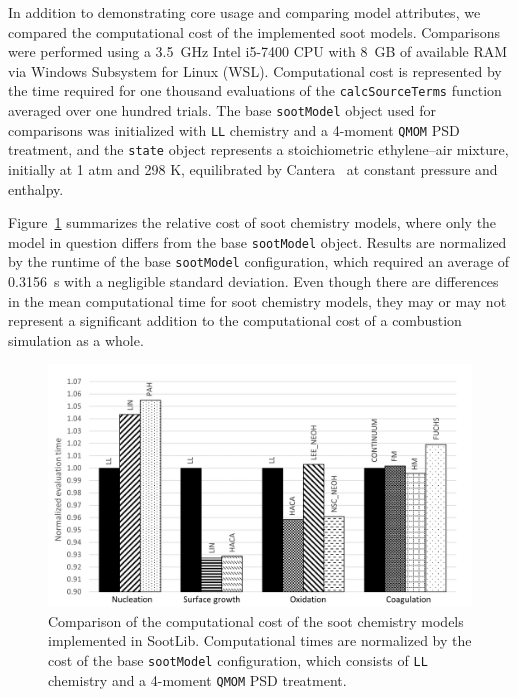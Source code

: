 \documentclass[preprint,letterpaper]{elsarticle}
\begin{document}
In addition to demonstrating core usage and comparing model attributes, we compared the computational cost of the implemented soot models. Comparisons were performed using a 3.5~\si{GHz} Intel i5-7400 CPU with 8~\si{GB} of available RAM via Windows Subsystem for Linux (WSL). Computational cost is represented by the time required for one thousand evaluations of the \texttt{calcSourceTerms} function averaged over one hundred trials. The base \texttt{sootModel} object used for comparisons was initialized with \texttt{LL} chemistry and a 4-moment \texttt{QMOM} PSD treatment, and the \texttt{state} object represents a stoichiometric ethylene--air mixture, initially at 1 \si{atm} and 298 \si{K}, equilibrated by Cantera~\cite{Goodwin_2018} at constant pressure and enthalpy.

Figure~\ref{f:cost_chem} summarizes the relative cost of soot chemistry models, where only the model in question differs from the base \texttt{sootModel} object. Results are normalized by the runtime of the base \texttt{sootModel} configuration, which required an average of 0.3156~\si{s} with a negligible standard deviation.
Even though there are differences in the mean computational time for soot chemistry models, they may or may not represent a significant addition to the computational cost of a combustion simulation as a whole.
%
\begin{figure}
    \begin{center}
        \includegraphics[width=\textwidth]{../figures/comp_cost_chem}
    \end{center}
    \caption{Comparison of the computational cost of the soot chemistry models implemented in SootLib. Computational times are normalized by the cost of the base \texttt{sootModel} configuration, which consists of \texttt{LL} chemistry and a 4-moment \texttt{QMOM} PSD treatment.}
    \label{f:cost_chem}
\end{figure}
%
\end{document}
